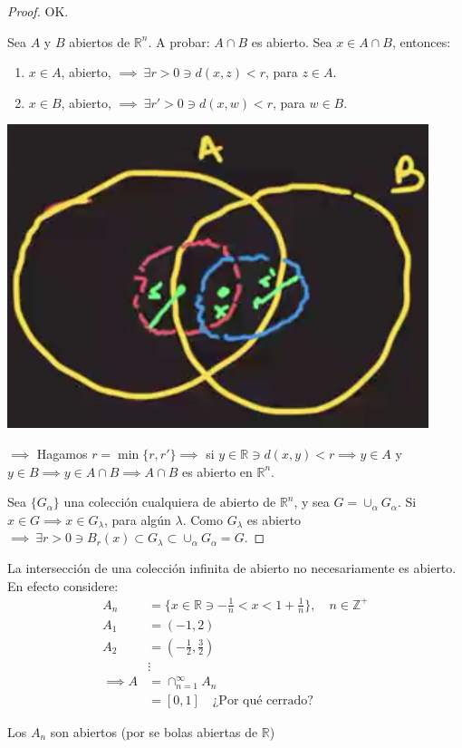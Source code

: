 \begin{proof}
	\item OK. 
	\item Sea $A$ y $B$ abiertos de $\mathbb{R}^n$. A probar: $A\cap B$ es abierto. Sea $x\in A\cap B$, entonces: 
	\begin{enumerate}
		\item $x\in A$, abierto, $\implies \ \exists r>0\ni d(x,z)<r$, para $z\in A$. 
		\item $x\in B$, abierto, $\implies \ \exists r'>0\ni d(x,w)<r$, para $w\in B$.  
	\end{enumerate}
	\begin{center}
	\includegraphics[scale=0.4]{images/2/5}
\end{center}
	$\implies$ Hagamos $r=\min\{r,r'\}\implies $ si $y\in \mathbb{R}\ni d(x,y)<r\implies y\in A$ y $y\in B\implies y\in A\cap B\implies A\cap B$ es abierto en $\mathbb{R}^n$. 
	
	\item Sea $\{G_\alpha\}$ una colección cualquiera de abierto de $\mathbb{R}^n$, y sea $G=\cup_{\alpha} G_\alpha$. Si $x\in G\implies x\in G_\lambda$, para algún $\lambda$. Como $G_\lambda$ es abierto $\implies \ \exists r>0 \ni B_r(x)\subset G_\lambda \subset \cup_\alpha G_\alpha =G$. 
\end{proof}

\begin{nota}
	La intersección de una colección infinita de abierto no necesariamente es abierto. En efecto considere: 
	\begin{align*}
		A_n &= \{x\in\mathbb{R}\ni -\frac{1}{n}<x<1+\frac{1}{n}\}, \quad n\in\mathbb{Z}^+\\
		A_1 &= (-1,2)\\
		A_2 &= \left(-\frac{1}{2}, \frac{3}{2}\right)\\
		&\vdots\\
		\implies A &= \cap_{n=1}^\infty A_n\\
	&= [0,1]\quad \text{¿Por qué cerrado?}
		\end{align*}
	
	\begin{cajita}
		Los $A_n$ son abiertos (por se bolas abiertas de $\mathbb{R}$)
	\end{cajita}
\end{nota}

